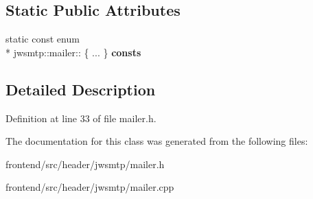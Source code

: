 \subsection*{Static Public Attributes}
\begin{DoxyCompactItemize}
\item 
\hypertarget{classjwsmtp_1_1mailer_abdf7408f0f12643fa0591ea90ebd151f}{static const enum \\*
jwsmtp\-::mailer\-:: \{ ... \}  {\bfseries consts}}\label{classjwsmtp_1_1mailer_abdf7408f0f12643fa0591ea90ebd151f}

\end{DoxyCompactItemize}


\subsection{Detailed Description}


Definition at line 33 of file mailer.\-h.



The documentation for this class was generated from the following files\-:\begin{DoxyCompactItemize}
\item 
frontend/src/header/jwsmtp/mailer.\-h\item 
frontend/src/header/jwsmtp/mailer.\-cpp\end{DoxyCompactItemize}
